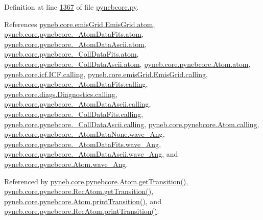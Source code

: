Definition at line \hyperlink{pynebcore_8py_source_l01367}{1367} of file \hyperlink{pynebcore_8py_source}{pynebcore.\+py}.



References \hyperlink{emis_grid_8py_source_l00048}{pyneb.\+core.\+emis\+Grid.\+Emis\+Grid.\+atom}, \hyperlink{pynebcore_8py_source_l00082}{pyneb.\+core.\+pynebcore.\+\_\+\+Atom\+Data\+Fits.\+atom}, \hyperlink{pynebcore_8py_source_l00303}{pyneb.\+core.\+pynebcore.\+\_\+\+Atom\+Data\+Ascii.\+atom}, \hyperlink{pynebcore_8py_source_l00559}{pyneb.\+core.\+pynebcore.\+\_\+\+Coll\+Data\+Fits.\+atom}, \hyperlink{pynebcore_8py_source_l00909}{pyneb.\+core.\+pynebcore.\+\_\+\+Coll\+Data\+Ascii.\+atom}, \hyperlink{pynebcore_8py_source_l01164}{pyneb.\+core.\+pynebcore.\+Atom.\+atom}, \hyperlink{icf_8py_source_l00016}{pyneb.\+core.\+icf.\+I\+C\+F.\+calling}, \hyperlink{emis_grid_8py_source_l00041}{pyneb.\+core.\+emis\+Grid.\+Emis\+Grid.\+calling}, \hyperlink{pynebcore_8py_source_l00090}{pyneb.\+core.\+pynebcore.\+\_\+\+Atom\+Data\+Fits.\+calling}, \hyperlink{diags_8py_source_l00169}{pyneb.\+core.\+diags.\+Diagnostics.\+calling}, \hyperlink{pynebcore_8py_source_l00311}{pyneb.\+core.\+pynebcore.\+\_\+\+Atom\+Data\+Ascii.\+calling}, \hyperlink{pynebcore_8py_source_l00568}{pyneb.\+core.\+pynebcore.\+\_\+\+Coll\+Data\+Fits.\+calling}, \hyperlink{pynebcore_8py_source_l00918}{pyneb.\+core.\+pynebcore.\+\_\+\+Coll\+Data\+Ascii.\+calling}, \hyperlink{pynebcore_8py_source_l01175}{pyneb.\+core.\+pynebcore.\+Atom.\+calling}, \hyperlink{pynebcore_8py_source_l00057}{pyneb.\+core.\+pynebcore.\+\_\+\+Atom\+Data\+None.\+wave\+\_\+\+Ang}, \hyperlink{pynebcore_8py_source_l00165}{pyneb.\+core.\+pynebcore.\+\_\+\+Atom\+Data\+Fits.\+wave\+\_\+\+Ang}, \hyperlink{pynebcore_8py_source_l00426}{pyneb.\+core.\+pynebcore.\+\_\+\+Atom\+Data\+Ascii.\+wave\+\_\+\+Ang}, and \hyperlink{pynebcore_8py_source_l01198}{pyneb.\+core.\+pynebcore.\+Atom.\+wave\+\_\+\+Ang}.



Referenced by \hyperlink{pynebcore_8py_source_l01406}{pyneb.\+core.\+pynebcore.\+Atom.\+get\+Transition()}, \hyperlink{pynebcore_8py_source_l02756}{pyneb.\+core.\+pynebcore.\+Rec\+Atom.\+get\+Transition()}, \hyperlink{pynebcore_8py_source_l01425}{pyneb.\+core.\+pynebcore.\+Atom.\+print\+Transition()}, and \hyperlink{pynebcore_8py_source_l02775}{pyneb.\+core.\+pynebcore.\+Rec\+Atom.\+print\+Transition()}.



